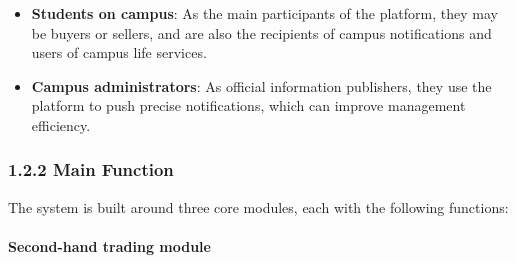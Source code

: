 \documentclass{article}
\begin{document}
\begin{itemize}
    \item \textbf{Students on campus}: As the main participants of the platform, they may be buyers or sellers, and are also the recipients of campus notifications and users of campus life services.
    \item \textbf{Campus administrators}: As official information publishers, they use the platform to push precise notifications, which can improve management efficiency.
\end{itemize}

\subsubsection{1.2.2 Main Function}

The system is built around three core modules, each with the following functions:

\paragraph{Second-hand trading module}\mbox{}\\
\end{document}
